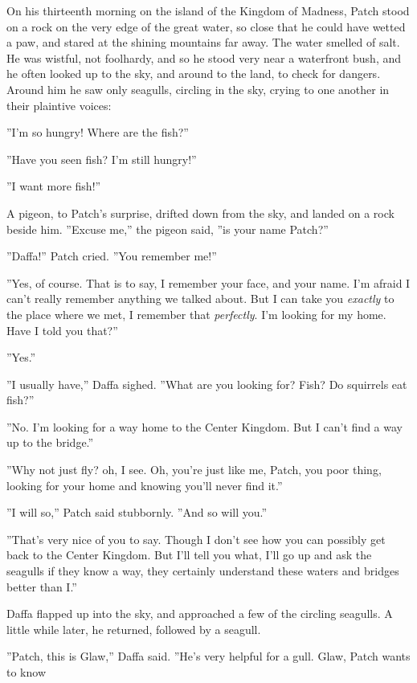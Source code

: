 \documentclass[12pt]{book}
\begin{document}
 On his thirteenth morning on the island of the Kingdom of Madness, Patch stood on a rock on the very edge of the great water, so close that he could have wetted a paw, and stared at the shining mountains far away. The water smelled of salt. He was wistful, not foolhardy, and so he stood very near a waterfront bush, and he often looked up to the sky, and around to the land, to check for dangers. Around him he saw only seagulls, circling in the sky, crying to one another in their plaintive voices:\par
''I'm so hungry! Where are the fish?''\par
''Have you seen fish? I'm still hungry!''\par
''I want more fish!''\par
 A pigeon, to Patch's surprise, drifted down from the sky, and landed on a rock beside him. ''Excuse me,'' the pigeon said, ''is your name Patch?''\par
 ''Daffa!'' Patch cried. ''You remember me!''\par
 ''Yes, of course. That is to say, I remember your face, and your name. I'm afraid I can't really remember anything we talked about. But I can take you {\it exactly} to the place where we met, I remember that {\it perfectly}. I'm looking for my home. Have I told you that?''\par
 ''Yes.''\par
 ''I usually have,'' Daffa sighed. ''What are you looking for? Fish? Do squirrels eat fish?''\par
 ''No. I'm looking for a way home to the Center Kingdom. But I can't find a way up to the bridge.''\par
 ''Why not just fly? %
 oh, I see. Oh, you're just like me, Patch, you poor thing, looking for your home and knowing you'll never find it.''\par
 ''I will so,'' Patch said stubbornly. ''And so will you.''\par
 ''That's very nice of you to say. Though I don't see how you can possibly get back to the Center Kingdom. But I'll tell you what, I'll go up and ask the seagulls if they know a way, they certainly understand these waters and bridges better than I.''\par
 Daffa flapped up into the sky, and approached a few of the circling seagulls. A little while later, he returned, followed by a seagull.\par
 ''Patch, this is Glaw,'' Daffa said. ''He's very helpful for a gull. Glaw, Patch wants to know%
\end{document}
